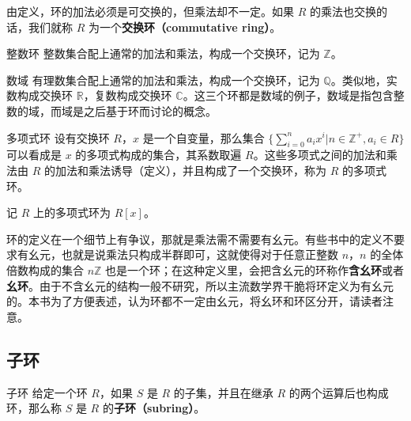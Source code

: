由定义，环的加法必须是可交换的，但乘法却不一定。如果 $R$ 的乘法也交换的话，我们就称 $R$ 为一个\textbf{交换环（commutative ring）}。

\begin{example}{整数环}
整数集合配上通常的加法和乘法，构成一个交换环，记为 $\mathbb{Z}$。
\end{example}

\begin{example}{数域}
有理数集合配上通常的加法和乘法，构成一个交换环，记为 $\mathbb{Q}$。类似地，实数构成交换环 $\mathbb{R}$，复数构成交换环 $\mathbb{C}$。这三个环都是数域的例子，数域是指包含整数的域，而域是之后基于环而讨论的概念。
\end{example}

\begin{example}{多项式环}\label{Ring_ex1}
设有交换环 $R$，$x$ 是一个自变量，那么集合 $\{\sum\limits_{i=0}^n a_ix^i|n\in\mathbb{Z}^+, a_i\in R\}$ 可以看成是 $x$ 的多项式构成的集合，其系数取遍 $R$。这些多项式之间的加法和乘法由 $R$ 的加法和乘法诱导（定义），并且构成了一个交换环，称为 $R$ 的多项式环。

记 $R$ 上的多项式环为 $R[x]$。
\end{example}

环的定义在一个细节上有争议，那就是乘法需不需要有幺元。有些书中的定义不要求有幺元，也就是说乘法只构成半群即可，这就使得对于任意正整数 $n$，$n$ 的全体倍数构成的集合 $n\mathbb{Z}$ 也是一个环；在这种定义里，会把含幺元的环称作\textbf{含幺环}或者\textbf{幺环}。由于不含幺元的结构一般不研究，所以主流数学界干脆将环定义为有幺元的。本书为了方便表述，认为环都不一定由幺元，将幺环和环区分开，请读者注意。

\subsection{子环}

\begin{definition}{子环}
给定一个环 $R$，如果 $S$ 是 $R$ 的子集，并且在继承 $R$ 的两个运算后也构成环，那么称 $S$ 是 $R$ 的\textbf{子环（subring）}。
\end{definition}



